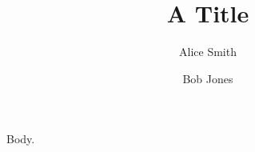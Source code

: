 \documentclass{llncs}
\begin{document}
\title{A Title}
\author{Alice Smith \and Bob Jones}
\maketitle
Body.
\end{document}
